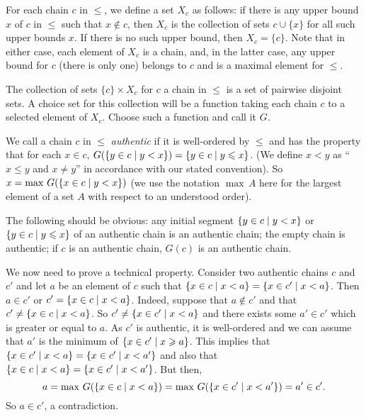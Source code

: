 For each chain $c$ in $\leq$, we define a set $X_c$ as follows: if
there is any upper bound $x$ of $c$ in $\leq$ such that $x
\not\in c$, then $X_c$ is the collection of sets $c \cup \{x\}$ for all such
upper bounds $x$.  If there is no such upper bound, then $X_c = \{c\}$.
Note that in either case, each element of $X_c$ is a chain, and, in
the latter case, any upper bound for $c$ (there is only one) belongs
to $c$ and is a maximal element for $\leq$.

The collection of sets $\{c\} \times X_c$ for $c$ a chain in $\leq$ is
a set of pairwise disjoint sets.  A choice set for this
collection will be a function taking each chain $c$ to a
selected element of $X_c$.  Choose such a function and call it $G$.

We call a chain $c$ in $\leq$ {\itshape authentic\/} if
it is well-ordered by $\leq$ and has the property that for each $x \in c$,
$G(\{y \in c \mid y < x\}) = \{y \in c \mid y \leqslant x\}$.  (We define $x<y$ as
``$x \leq y$ and $x \neq y$'' in accordance with our stated convention).
So $x = \max\, G(\{x \in c \mid y < x\})$ (we use the notation $\max \,A$
here for the largest element of a set $A$ with respect to an
understood order).

The following should be obvious: any initial segment $\{y \in c
\mid y < x\}$ or $\{y \in c \mid y \leqslant x\}$ of an authentic
chain
is an authentic chain; the empty chain is authentic; if $c$ is an
authentic chain, $G(c)$ is an authentic chain.

We now need to prove a technical property.
Consider two authentic chains $c$ and $c'$ and let $a$ be an element of
$c$ such that $\{x \in c \mid x < a\} = \{x \in c' \mid x < a\}$.
Then $a \in c'$ or $c' = \{x \in c \mid x < a\}$.
Indeed, suppose that $a \not\in c'$ and that $c' \neq \{x \in c \mid x < a\}$.
So $c' \neq \{x \in c' \mid x < a\}$ and there exists some $a' \in c'$
which is greater or equal to $a$.
As $c'$ is authentic, it is well-ordered and we can assume that $a'$ is the
minimum of $\{x \in c' \mid x \geqslant a\}$.
This implies that $\{x \in c' \mid x < a\} = \{x \in c' \mid x < a'\}$ and also
that $\{x \in c \mid x < a\} = \{x \in c' \mid x < a'\}$.
But then,
\begin{displaymath}
 a = \max\, G(\{x \in c \mid x < a\}) = \max\, G(\{x \in c' \mid x < a'\}) = a'
 \in c'.
\end{displaymath}
So $a \in c'$, a contradiction.

